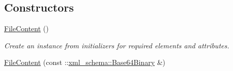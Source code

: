 \subsection*{Constructors}
\begin{DoxyCompactItemize}
\item 
\hypertarget{classopenstack_1_1xml_1_1FileContent_a409152d80dbf97c1cd576be54e4c21b4}{
\hyperlink{classopenstack_1_1xml_1_1FileContent_a409152d80dbf97c1cd576be54e4c21b4}{FileContent} ()}
\label{classopenstack_1_1xml_1_1FileContent_a409152d80dbf97c1cd576be54e4c21b4}

\begin{DoxyCompactList}\small\item\em Create an instance from initializers for required elements and attributes. \item\end{DoxyCompactList}\item 
\hypertarget{classopenstack_1_1xml_1_1FileContent_ad15ee0309c3bae6f9b4a1753adc7f88a}{
\hyperlink{classopenstack_1_1xml_1_1FileContent_ad15ee0309c3bae6f9b4a1753adc7f88a}{FileContent} (const ::\hyperlink{namespacexml__schema_a439c138de03306df7e07a447abfe54ed}{xml\_\-schema::Base64Binary} \&)}
\label{classopenstack_1_1xml_1_1FileContent_ad15ee0309c3bae6f9b4a1753adc7f88a}


\end{DoxyCompactItemize}
